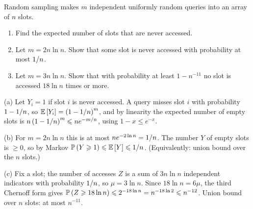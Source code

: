 
\begin{question}
    Random sampling makes $m$ independent uniformly random queries into an array of $n$ slots.
    \begin{enumerate}[label=(\alph*)]
        \item Find the expected number of slots that are never accessed.
        \item Let $m = 2n \ln n$. Show that some slot is never accessed with probability at most
              $1/n$.
        \item Let $m = 3n \ln n$. Show that with probability at least $1 - n^{-11}$ no slot is
              accessed $18 \ln n$ times or more.
    \end{enumerate}
\end{question}
\begin{msolution}
    (a) Let $Y_i = 1$ if slot $i$ is never accessed. A query misses slot $i$ with probability
    $1 - 1/n$, so $\operatorname{\mathbb{E}}\left[Y_i\right] = \left(1 - 1/n\right)^m$, and by linearity
    the expected number of empty slots is
    $n\left(1 - 1/n\right)^m \leqslant n e^{-m/n}$, using $1 - x \leq e^{-x}$.

    (b) For $m = 2n \ln n$ this is at most $n e^{-2 \ln n} = 1/n$. The number $Y$ of empty
    slots is $\geq 0$, so by Markov $\operatorname{\mathbb{P}}\left(Y \geqslant 1\right) \leqslant \operatorname{\mathbb{E}}\left[Y\right] \leqslant 1/n$.
    (Equivalently: union bound over the $n$ slots.)

    (c) Fix a slot; the number of accesses $Z$ is a sum of $3n \ln n$ independent indicators with
    probability $1/n$, so $\mu = 3 \ln n$. Since $18 \ln n = 6\mu$, the third Chernoff form
    gives $\operatorname{\mathbb{P}}\left(Z \geqslant 18 \ln n\right) \leqslant 2^{-18 \ln n} = n^{-18 \ln 2} \leqslant n^{-12}$. Union bound
    over $n$ slots: at most $n^{-11}$.
\end{msolution}

